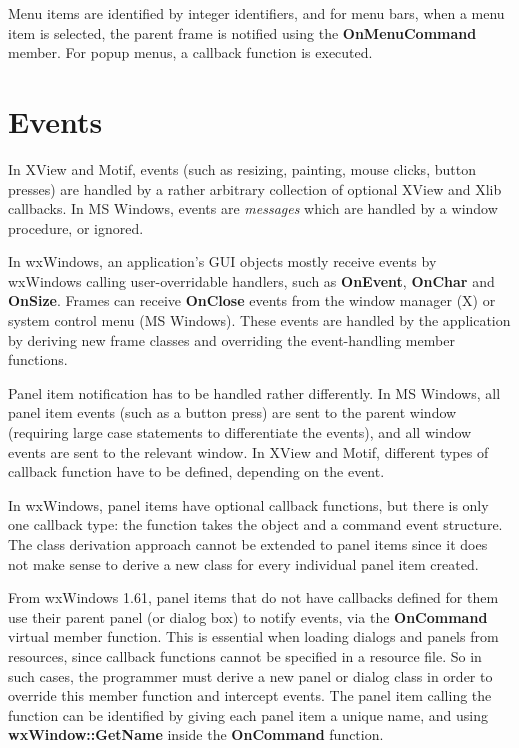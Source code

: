Menu items are identified by integer identifiers, and for menu bars,
when a menu item is selected, the parent frame is notified using the\rtfsp
{\bf OnMenuCommand} member. For popup menus, a callback function is
executed.

\section{Events}

In XView and Motif, events (such as resizing, painting, mouse clicks, button
presses) are handled by a rather arbitrary collection of optional
XView and Xlib callbacks. In MS Windows, events are {\it messages}\rtfsp
which are handled by a window procedure, or ignored.

In wxWindows, an application's GUI objects mostly receive events by
wxWindows calling user-overridable handlers, such as {\bf OnEvent}, {\bf
OnChar} and {\bf OnSize}.  Frames can receive {\bf OnClose} events from
the window manager (X) or system control menu (MS Windows). These events
are handled by the application by deriving new frame classes and
overriding the event-handling member functions.

Panel item notification has to be handled rather differently. In
MS Windows, all panel item events (such as a button press) are sent to
the parent window (requiring large case statements to differentiate
the events), and all window events are sent to the relevant window. In
XView and Motif, different types of callback function have to be defined,
depending on the event.

In wxWindows, panel items have optional callback functions, but there is
only one callback type: the function takes the object and a command event
structure.  The class derivation approach cannot be extended to panel
items since it does not make sense to derive a new class for every
individual panel item created.

From wxWindows 1.61, panel items that do not have callbacks defined for
them use their parent panel (or dialog box) to notify events, via
the {\bf OnCommand} virtual member function. This is essential when
loading dialogs and panels from resources, since callback functions
cannot be specified in a resource file. So in such cases, the programmer
must derive a new panel or dialog class in order to override this member
function and intercept events. The panel item calling the function
can be identified by giving each panel item a unique name, and using\rtfsp
{\bf wxWindow::GetName} inside the {\bf OnCommand} function.

